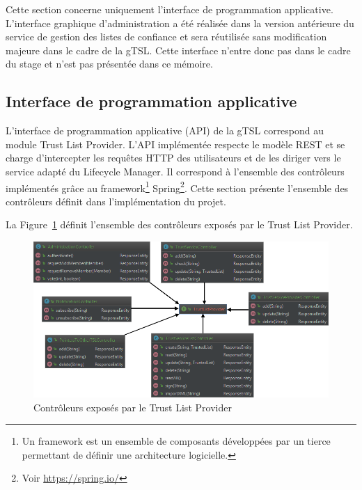 \documentclass{tnreport}
\begin{document}
Cette section concerne uniquement l'interface de programmation applicative. L'interface graphique d'administration a été réalisée dans la version antérieure du service de gestion des listes de confiance et sera réutilisée sans modification majeure dans le cadre de la gTSL. Cette interface n'entre donc pas dans le cadre du stage et n'est pas présentée dans ce mémoire.

\subsection{Interface de programmation applicative}

L'interface de programmation applicative (API) de la gTSL correspond au module Trust List Provider. L'API implémentée respecte le modèle REST et se charge d'intercepter les requêtes HTTP des utilisateurs et de les diriger vers le service adapté du Lifecycle Manager. Il correspond à l'ensemble des contrôleurs implémentés grâce au framework\footnote{Un framework est un ensemble de composants développées par un tierce permettant de définir une architecture logicielle.} Spring\footnote{Voir \url{https://spring.io/}}. Cette section présente l'ensemble des contrôleurs définit dans l'implémentation du projet.

La Figure~\ref{fig:rest-controllers} définit l'ensemble des contrôleurs exposés par le Trust List Provider.

\clearpage
\begin{figure}[h]
	\centering
	\includegraphics[scale=0.73]{figures/rest-controllers}
	\caption{Contrôleurs exposés par le Trust List Provider}
	\label{fig:rest-controllers}
\end{figure}
\end{document}
